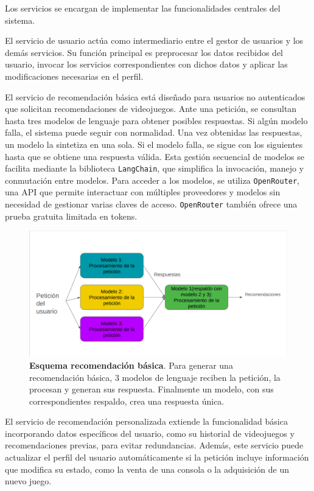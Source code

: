 Los servicios se encargan de implementar las funcionalidades centrales del sistema.

El servicio de usuario actúa como intermediario entre el gestor de usuarios y los demás servicios. Su función principal es preprocesar los datos recibidos del usuario, invocar los servicios correspondientes con dichos datos y aplicar las modificaciones necesarias en el perfil.

El servicio de recomendación básica está diseñado para usuarios no autenticados que solicitan recomendaciones de videojuegos. Ante una petición, se consultan hasta tres modelos de lenguaje para obtener posibles respuestas. Si algún modelo falla, el sistema puede seguir con normalidad. Una vez obtenidas las respuestas, un modelo la sintetiza en una sola. Si el modelo falla, se sigue con los siguientes hasta que se obtiene una respuesta válida. Esta gestión secuencial de modelos se facilita mediante la biblioteca \texttt{LangChain}, que simplifica la invocación, manejo y conmutación entre modelos. Para acceder a los modelos, se utiliza \texttt{OpenRouter}, una API que permite interactuar con múltiples proveedores y modelos sin necesidad de gestionar varias claves de acceso. \texttt{OpenRouter} también ofrece una prueba gratuita limitada en tokens.


\begin{figure}[H]
	\centering
	\includegraphics[width=1\linewidth]{imagenes/esquemaRecomendacionBasica.png}
	\caption[\textbf{Esquema recomendación básica}.]{\textbf{Esquema recomendación básica}. Para generar una recomendación básica, 3 modelos de lenguaje reciben la petición, la procesan y generan sus respuesta. Finalmente un modelo, con sus correspondientes respaldo, crea una respuesta única.}
	\label{esquemaRB}
\end{figure}


El servicio de recomendación personalizada extiende la funcionalidad básica incorporando datos específicos del usuario, como su historial de videojuegos y recomendaciones previas, para evitar redundancias. Además, este servicio puede actualizar el perfil del usuario automáticamente si la petición incluye información que modifica su estado, como la venta de una consola o la adquisición de un nuevo juego.

